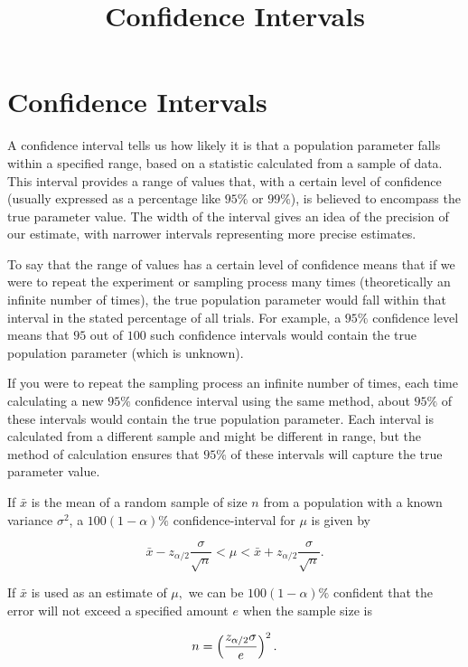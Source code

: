 \documentclass{article}
\title{Confidence Intervals}
\begin{document}
\section{Confidence Intervals}

\begin{definition}
A confidence interval tells us how likely it is that a population parameter falls within a specified range, based on a statistic calculated from a sample of data. This \@{interval} provides a range of values that, with a certain level of confidence (usually expressed as a percentage like $95\%$ or $99\%$), is believed to encompass the true parameter value. The width of the interval gives an idea of the precision of our estimate, with narrower intervals representing more precise estimates.

To say that the range of values has a certain level of confidence means that if we were to repeat the experiment or sampling process many times (theoretically an infinite number of times), the true population parameter would fall within that interval in the stated percentage of all trials. For example, a $95\%$ confidence level means that $95$ out of $100$ such confidence intervals would contain the true population parameter (which is unknown).

If you were to repeat the sampling process an infinite number of times, each time calculating a new $95\%$ confidence interval using the same method, about $95\%$ of these intervals would contain the true population parameter. Each interval is calculated from a different sample and might be different in range, but the method of calculation ensures that $95\%$ of these intervals will capture the true parameter value.
\end{definition}

\begin{theorem}\label{ci-mean-known-variance}
If $\bar{x}$ is the mean of a random sample of size $n$ from a population with a known \@{variance} $\sigma^2$, a $100(1-\alpha)\%$ \@{confidence-interval} for $\mu$ is given by

\[ \bar{x} - z_{\alpha/2} \frac{\sigma}{\sqrt{n}} < \mu < \bar{x} + z_{\alpha/2} \frac{\sigma}{\sqrt{n}}. \]
\end{theorem}

\begin{theorem}\label{sample-size-mean}
If $\bar{x}$ is used as an estimate of $\mu,$ we can be $100(1 - \alpha)\%$ confident that the error will not exceed a specified amount $e$ when the sample size is

\[ n = \left(\frac{z_{\alpha/2} \sigma}{e}\right)^2. \]
\end{theorem}
\end{document}
